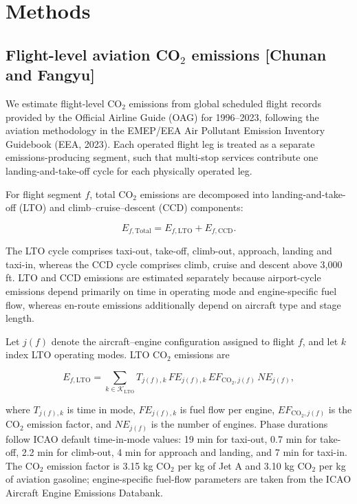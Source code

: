\documentclass[12pt]{article}
\begin{document}
\section*{Methods}
\subsection*{Flight-level aviation CO$_2$ emissions [Chunan and Fangyu]}

We estimate flight-level CO$_2$ emissions from global scheduled flight records provided by the Official Airline Guide (OAG) for 1996--2023, following the aviation methodology in the EMEP/EEA Air Pollutant Emission Inventory Guidebook (EEA, 2023). Each operated flight leg is treated as a separate emissions-producing segment, such that multi-stop services contribute one landing-and-take-off cycle for each physically operated leg.

For flight segment $f$, total CO$_2$ emissions are decomposed into landing-and-take-off (LTO) and climb--cruise--descent (CCD) components:

\begin{equation}
E_{f,\mathrm{Total}}
=
E_{f,\mathrm{LTO}}
+
E_{f,\mathrm{CCD}}.
\label{eq:nature_1}
\end{equation}

The LTO cycle comprises taxi-out, take-off, climb-out, approach, landing and taxi-in, whereas the CCD cycle comprises climb, cruise and descent above 3,000 ft. LTO and CCD emissions are estimated separately because airport-cycle emissions depend primarily on time in operating mode and engine-specific fuel flow, whereas en-route emissions additionally depend on aircraft type and stage length.

Let $j(f)$ denote the aircraft--engine configuration assigned to flight $f$, and let $k$ index LTO operating modes. LTO CO$_2$ emissions are

\begin{equation}
E_{f,\mathrm{LTO}}
=
\sum_{k\in\mathcal K_{\mathrm{LTO}}}
T_{j(f),k}
\,FE_{j(f),k}
\,EF_{\mathrm{CO_2},j(f)}
\,NE_{j(f)},
\label{eq:nature_2}
\end{equation}

where $T_{j(f),k}$ is time in mode, $FE_{j(f),k}$ is fuel flow per engine, $EF_{\mathrm{CO_2},j(f)}$ is the CO$_2$ emission factor, and $NE_{j(f)}$ is the number of engines. Phase durations follow ICAO default time-in-mode values: 19 min for taxi-out, 0.7 min for take-off, 2.2 min for climb-out, 4 min for approach and landing, and 7 min for taxi-in. The CO$_2$ emission factor is 3.15 kg CO$_2$ per kg of Jet A and 3.10 kg CO$_2$ per kg of aviation gasoline; engine-specific fuel-flow parameters are taken from the ICAO Aircraft Engine Emissions Databank.
\end{document}

